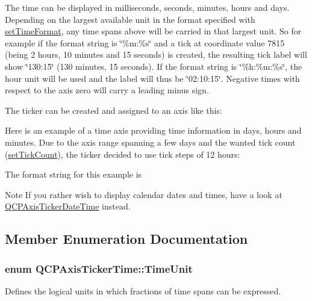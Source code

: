 The time can be displayed in milliseconds, seconds, minutes, hours and days. Depending on the largest available unit in the format specified with \hyperlink{classQCPAxisTickerTime_a2f30b6e5125bce4256be9ce3177088ea}{set\+Time\+Format}, any time spans above will be carried in that largest unit. So for example if the format string is \char`\"{}\%m\+:\%s\char`\"{} and a tick at coordinate value 7815 (being 2 hours, 10 minutes and 15 seconds) is created, the resulting tick label will show \char`\"{}130\+:15\char`\"{} (130 minutes, 15 seconds). If the format string is \char`\"{}\%h\+:\%m\+:\%s\char`\"{}, the hour unit will be used and the label will thus be \char`\"{}02\+:10\+:15\char`\"{}. Negative times with respect to the axis zero will carry a leading minus sign.

The ticker can be created and assigned to an axis like this\+: 
\begin{DoxyCodeInclude}
\end{DoxyCodeInclude}
 Here is an example of a time axis providing time information in days, hours and minutes. Due to the axis range spanning a few days and the wanted tick count (\hyperlink{classQCPAxisTicker_a47752abba8293e6dc18491501ae34008}{set\+Tick\+Count}), the ticker decided to use tick steps of 12 hours\+:



The format string for this example is 
\begin{DoxyCodeInclude}
\end{DoxyCodeInclude}
 \begin{DoxyNote}{Note}
If you rather wish to display calendar dates and times, have a look at \hyperlink{classQCPAxisTickerDateTime}{Q\+C\+P\+Axis\+Ticker\+Date\+Time} instead. 
\end{DoxyNote}


\subsection{Member Enumeration Documentation}
\subsubsection[{\texorpdfstring{Time\+Unit}{TimeUnit}}]{\setlength{\rightskip}{0pt plus 5cm}enum {\bf Q\+C\+P\+Axis\+Ticker\+Time\+::\+Time\+Unit}}\hypertarget{classQCPAxisTickerTime_a5c48ded8c6d3a1aca9b68219469fea3e}{}\label{classQCPAxisTickerTime_a5c48ded8c6d3a1aca9b68219469fea3e}
Defines the logical units in which fractions of time spans can be expressed.

